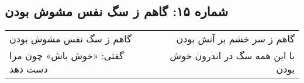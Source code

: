 \begin{center}
\section*{شماره ۱۵: گاهم ز سگ نفس مشوش بودن}
\label{sec:015}
\begin{longtable}{l p{0.5cm} r}
گاهم ز سگ نفس مشوش بودن
&&
گاهم ز سر خشم بر آتش بودن
\\
گفتی: «خوش باش» چون مرا دست دهد
&&
با این همه سگ در اندرون خوش بودن
\\
\end{longtable}
\end{center}
